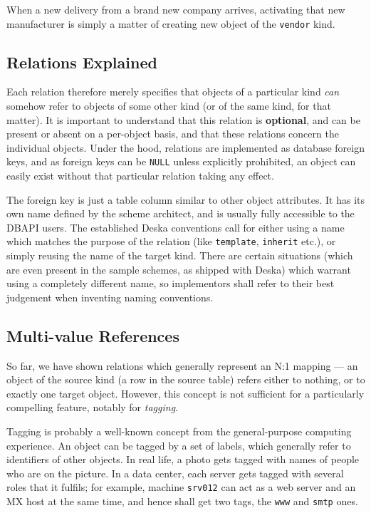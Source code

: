 \documentclass[deska]{subfiles}
\begin{document}
When a new delivery from a brand new company arrives, activating that new manufacturer is simply a matter of
creating new object of the {\tt vendor} kind.

\subsection{Relations Explained}

Each relation therefore merely specifies that objects of a particular kind {\em can} somehow refer to objects of some
other kind (or of the same kind, for that matter).  It is important to understand that this relation is {\bf optional},
and can be present or absent on a per-object basis, and that these relations concern the individual objects.  Under the
hood, relations are implemented as database foreign keys, and as foreign keys can be {\tt NULL} unless explicitly
prohibited, an object can easily exist without that particular relation taking any effect.

The foreign key is just a table column similar to other object attributes.  It has its own name defined by the scheme
architect, and is usually fully accessible to the DBAPI users.  The established Deska conventions call for either using
a name which matches the purpose of the relation (like {\tt template}, {\tt inherit} etc.), or simply reusing the name
of the target kind.  There are certain situations (which are even present in the sample schemes, as shipped with Deska)
which warrant using a completely different name, so implementors shall refer to their best judgement when inventing
naming conventions.

\subsection{Multi-value References}

So far, we have shown relations which generally represent an N:1 mapping --- an object of the source kind (a row in the
source table) refers either to nothing, or to exactly one target object.  However, this concept is not sufficient for a
particularly compelling feature, notably for {\em tagging}.

Tagging is probably a well-known concept from the general-purpose computing experience. An object can be tagged by a set
of labels, which generally refer to identifiers of other objects.  In real life, a photo gets tagged with names of
people who are on the picture.  In a data center, each server gets tagged with several roles that it fulfils; for
example, machine {\tt srv012} can act as a web server and an MX host at the same time, and hence shall get two tags, the
{\tt www} and {\tt smtp} ones.
\end{document}
